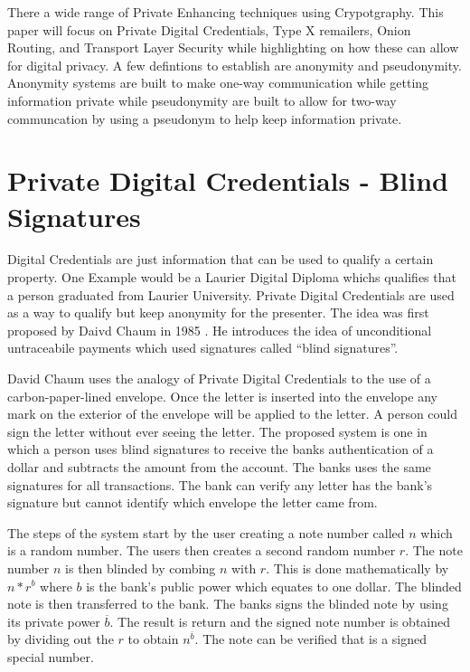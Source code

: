 \documentclass[12pt]{article}
\begin{document}
There a wide range of Private Enhancing techniques using Crypotgraphy. This paper will focus on Private Digital Credentials, Type X remailers, Onion Routing, and Transport Layer Security while highlighting on how these can allow for digital privacy. A few defintions to establish are anonymity and pseudonymity. Anonymity systems are built to make one-way communication while getting information private while pseudonymity are built to allow for two-way communcation by using a pseudonym to help keep information private. \cite{GoldbergTwo}

\section{Private Digital Credentials - Blind Signatures}\label{sec:PDC}
Digital Credentials are just information that can be used to qualify a certain property. One Example would be a Laurier Digital Diploma whichs qualifies that a person graduated from Laurier University.  Private Digital Credentials are used as a way to qualify but keep anonymity for the presenter. The idea was first proposed by Daivd Chaum in 1985 \cite{Chaum}. He introduces the idea of unconditional untraceabile payments which used signatures called ``blind signatures''\cite{Chaum}. 

David Chaum uses the analogy of Private Digital Credentials to the use of a carbon-paper-lined envelope. Once the letter is inserted into the envelope any mark on the exterior of the envelope will be applied to the letter. A person could sign the letter without ever seeing the letter. The proposed system is one in which a person uses blind signatures to receive the banks authentication of a dollar and subtracts the amount from the account. The banks uses the same signatures for all transactions. The bank can verify any letter has the bank's signature but cannot identify which envelope the letter came from.

The steps of the system start by the user creating a note number called $n$ which is a random number. The users then creates a second random number  $r$. The note number $n$ is then blinded by combing $n$ with $r$. This is done mathematically by $n * r^b$ where $b$ is the bank's public power which equates to one dollar. The blinded note is then transferred to the bank. The banks signs the blinded note by using its private power $\overline{b}$. The result is return and the signed note number is obtained by dividing out the $r$ to obtain $n^{\overline{b}}$. The note can be verified that is a signed special number.
\end{document}
